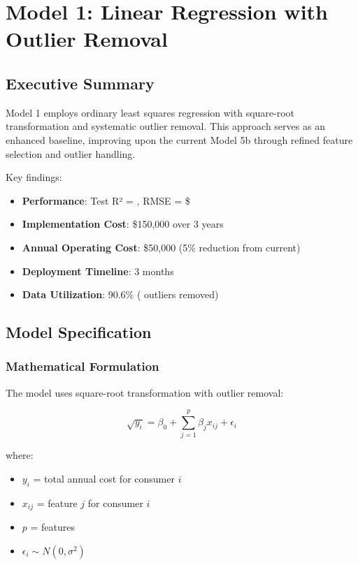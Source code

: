 \chapter{Model 1: Linear Regression with Outlier Removal}\label{ch:model1}



\section{Executive Summary}

Model 1 employs ordinary least squares regression with square-root transformation and systematic outlier removal. This approach serves as an enhanced baseline, improving upon the current Model 5b through refined feature selection and outlier handling.

Key findings:
\begin{itemize}
    \item \textbf{Performance}: Test R² = \ModelOneRSquaredTest{}, RMSE = \$\ModelOneRMSETest{}
    \item \textbf{Implementation Cost}: \$150,000 over 3 years
    \item \textbf{Annual Operating Cost}: \$50,000 (5\% reduction from current)
    \item \textbf{Deployment Timeline}: 3 months
    \item \textbf{Data Utilization}: 90.6\% (\ModelOneOutliersRemoved{} outliers removed)
\end{itemize}

\section{Model Specification}

\subsection{Mathematical Formulation}

The model uses square-root transformation with outlier removal:

\begin{equation}
\sqrt{y_i} = \beta_0 + \sum_{j=1}^{p} \beta_j x_{ij} + \epsilon_i
\end{equation}

where:
\begin{itemize}
    \item $y_i$ = total annual cost for consumer $i$
    \item $x_{ij}$ = feature $j$ for consumer $i$
    \item $p$ = \ModelOneNumFeatures{} features
    \item $\epsilon_i \sim N(0, \sigma^2)$
\end{itemize}

